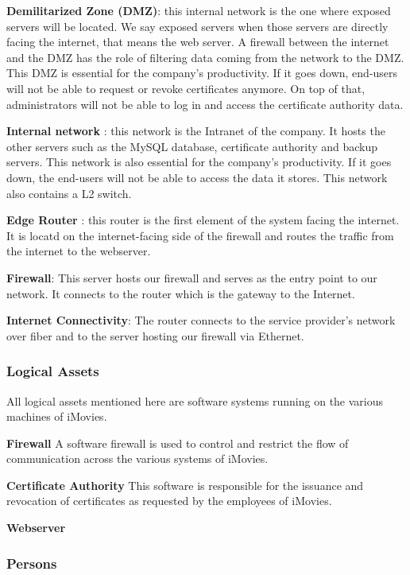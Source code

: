 \documentclass[english]{article}
\begin{document}
\textbf{Demilitarized Zone (DMZ)}: this internal network is the one where exposed servers will be located. We say exposed servers when those servers are directly facing the internet, that means the web server. A firewall between the internet and the DMZ has the role of filtering data coming from the network to the DMZ. This DMZ is essential for the company's productivity. If it goes down, end-users will not be able to request or revoke certificates anymore. On top of that, administrators will not be able to log in and access the certificate authority data.

\textbf{Internal network} : this network is the Intranet of the company. It hosts the other servers such as the MySQL database, certificate authority and backup servers. This network is also essential for the company's productivity. If it goes down, the end-users will not be able to access the data it stores. This network also contains a L2 switch.

\textbf{Edge Router} : this router is the first element of the system facing the internet. It is locatd on the internet-facing side of the firewall and routes the traffic from the internet to the webserver. 

\textbf{Firewall}: This server hosts our firewall and serves as the entry point to our network. It connects to the router which is the gateway to the Internet.

\textbf{Internet Connectivity}: The router connects to the service provider’s network over fiber and to the server hosting our firewall via Ethernet.

\subsubsection{Logical Assets}

All logical assets mentioned here are software systems running on the various machines of iMovies.

\textbf{Firewall} A software firewall is used to control and restrict the flow of communication across the various systems of iMovies.

\textbf{Certificate Authority} This software is responsible for the issuance and revocation of certificates as requested by the employees of iMovies.

\textbf{Webserver} 





\subsubsection{Persons}
\end{document}
